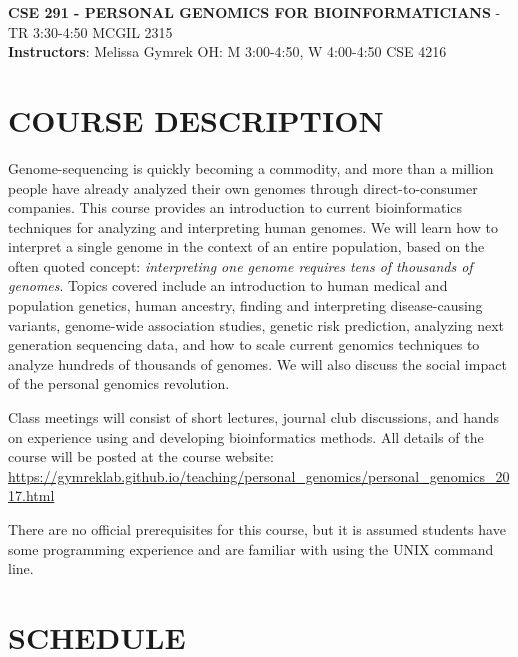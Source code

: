 \documentclass[12pt]{article}
\begin{document}
\textbf{CSE 291 - PERSONAL GENOMICS FOR BIOINFORMATICIANS} - TR 3:30-4:50 MCGIL 2315 \\
\textbf{Instructors}: Melissa Gymrek OH: M 3:00-4:50, W 4:00-4:50 CSE 4216 \\

\section*{COURSE DESCRIPTION}
Genome-sequencing is quickly becoming a commodity, and more than a million people have already analyzed their own genomes through direct-to-consumer companies. This course provides an introduction to current bioinformatics techniques for analyzing and interpreting human genomes. We will learn how to interpret a single genome in the context of an entire population, based on the often quoted concept: \emph{interpreting one genome requires tens of thousands of genomes}. Topics covered include an introduction to human medical and population genetics, human ancestry, finding and interpreting disease-causing variants, genome-wide association studies, genetic risk prediction, analyzing next generation sequencing data, and how to scale current genomics techniques to analyze hundreds of thousands of genomes. We will also discuss the social impact of the personal genomics revolution.

Class meetings will consist of short lectures, journal club discussions, and hands on experience using and developing bioinformatics methods. All details of the course will be posted at the course website:\\
\href{https://gymreklab.github.io/teaching/personal\_genomics/personal\_genomics_2017.html}{https://gymreklab.github.io/teaching/personal\_genomics/personal\_genomics\_2017.html}

There are no official prerequisites for this course, but it is assumed students have some programming experience and are familiar with using the UNIX command line.




\section*{SCHEDULE}
\end{document}
